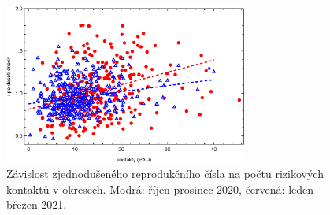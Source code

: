 \begin{enumerate}
\begin{figure}
\begin{center}
\includegraphics[width=8cm]{pic/sbornikRegrese010.eps}
\caption{Závislost zjednodušeného reprodukčního čísla na počtu rizikových kontaktů v okresech. Modrá: říjen-prosinec 2020, červená: leden-březen 2021.}
\label{fig:okresy}
\end{center}
\end{figure}


\end{enumerate}
